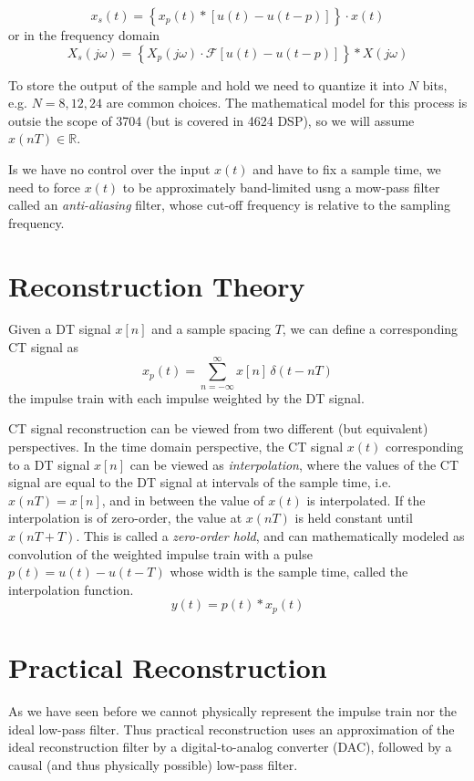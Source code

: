 \documentclass{article}
\begin{document}
\[
x_s(t) = \left\{ x_p(t) * \left[u(t) - u(t-p) \right] \right\}\cdot x(t)
\]
or in the frequency domain
\[
X_s(j\omega) = \left\{ X_p(j\omega)\cdot \mathcal{F}\left[u(t) - u(t-p) \right] \right\}* X(j\omega)
\]

To store the output of the sample and hold we need to quantize it into $N$ bits, e.g. $N = 8, 12, 24$ are common choices. The mathematical model for this process is outsie the scope of 3704 (but is covered in 4624 DSP), so we will assume $x(nT) \in\mathbb{R}$.

Is we have no control over the input $x(t)$ and have to fix a sample time, we need to force $x(t)$ to be approximately band-limited usng a mow-pass filter called an \textit{anti-aliasing} filter, whose cut-off frequency is relative to the sampling frequency.

\section{Reconstruction Theory}

Given a DT signal $x[n]$ and a sample spacing $T$, we can define a corresponding CT signal as 
\[
x_p(t) = \sum\limits_{n = -\infty}^{\infty} x[n] \, \delta(t-nT)
\]
the impulse train with each impulse weighted by the DT signal.

CT signal reconstruction can be viewed from two different (but equivalent) perspectives. In the time domain perspective, the CT signal $x(t)$ corresponding to a DT signal $x[n]$ can be viewed as \emph{interpolation}, where the values of the CT signal are equal to the DT signal at intervals of the sample time, i.e. $x(nT) = x[n]$, and in between the value of $x(t)$ is interpolated. If the interpolation is of zero-order, the value at $x(nT)$ is held constant until $x(nT+T)$. This is called a \emph{zero-order hold}, and can mathematically modeled as convolution of the weighted impulse train with a pulse $p(t) = u(t) - u(t-T)$ whose width is the sample time, called the interpolation function.
\[
y(t) = p(t)*x_p(t)
\]

\section{Practical Reconstruction}

As we have seen before we cannot physically represent the impulse train nor the ideal low-pass filter. Thus practical reconstruction uses an approximation of the ideal reconstruction filter by a digital-to-analog converter (DAC), followed by a causal (and thus physically possible) low-pass filter.
\end{document}
